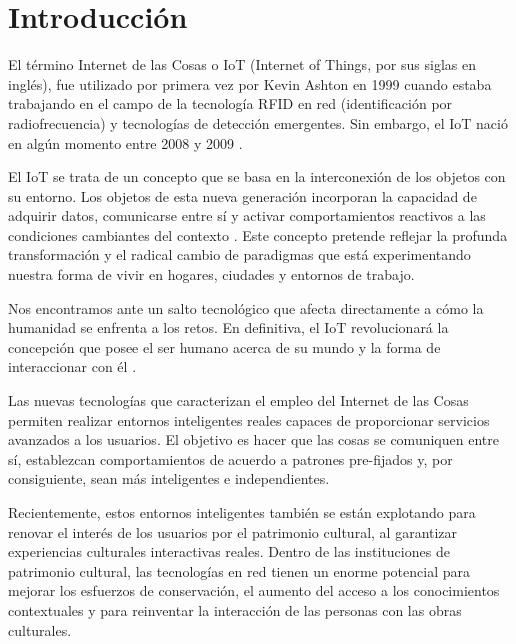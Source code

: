 \renewcommand{\thepage}{\arabic{page}}

    \section*{\LARGE Introducción}

    \setcounter{page}{1} %
    \pagestyle{plain} %

    El término Internet de las Cosas o IoT (Internet of Things, por sus siglas en inglés), fue utilizado por primera vez por Kevin Ashton en 1999 cuando estaba trabajando en el campo de la tecnología RFID en red (identificación por radiofrecuencia) y tecnologías de detección emergentes. Sin embargo, el IoT nació en algún momento entre 2008 y 2009 \cite{evolucionIoT}.

    El IoT se trata de un concepto que se basa en la interconexión de los objetos con su entorno. Los objetos de esta nueva generación incorporan la capacidad de adquirir datos, comunicarse entre sí y activar comportamientos reactivos a las condiciones cambiantes del contexto \cite{agriculturaPrecision}. Este concepto pretende reflejar la profunda transformación y el radical cambio de paradigmas que está experimentando nuestra forma de vivir en hogares, ciudades y entornos de trabajo.

    Nos encontramos ante un salto tecnológico que afecta directamente a cómo la humanidad se enfrenta a los retos. En definitiva, el IoT revolucionará la concepción que posee el ser humano acerca de su mundo y la forma de interaccionar con él \cite{revolucionDefinitiva}.

    Las nuevas tecnologías que caracterizan el empleo del Internet de las Cosas permiten realizar entornos inteligentes reales capaces de proporcionar servicios avanzados a los usuarios. El objetivo es hacer que las cosas se comuniquen entre sí, establezcan comportamientos de acuerdo a patrones pre-fijados y, por consiguiente, sean más inteligentes e independientes.

    Recientemente, estos entornos inteligentes también se están explotando para renovar el interés de los usuarios por el patrimonio cultural, al garantizar experiencias culturales interactivas reales. Dentro de las instituciones de patrimonio cultural, las tecnologías en red tienen un enorme potencial para mejorar los esfuerzos de conservación, el aumento del acceso a los conocimientos contextuales y para reinventar la interacción de las personas con las obras culturales.

